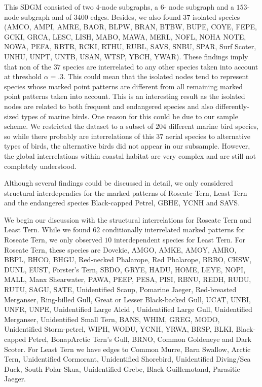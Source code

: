 \documentclass{statsoc}
\begin{document}
This SDGM consisted of two $4$-node subgraphs, a $6$- node subgraph and a $153$-node subgraph and of 3400 edges. Besides, we also found $37$ isolated species (AMCO, AMPI, AMRE, BAOR, BLPW, BRAN, BTBW, BUPE, COYE, FEPE, GCKI, GRCA, LESC, LISH, MABO, MAWA, MERL, NOFL, NOHA NOTE, NOWA, PEFA, RBTR, RCKI, RTHU, RUBL, SAVS, SNBU, SPAR, Surf Scoter, UNHU, UNPT, UNTB, USAN, WTSP, YBCH, YWAR). These findings imply that non of the $37$ species are interrelated to any other species taken into account at threshold $\alpha=.3$. This could mean that the isolated nodes tend to represent species whose marked point patterns are different from all remaining marked point patterns taken into account. This is an interesting result as the isolated nodes are related to both frequent and endangered species and also differently-sized types of marine birds. One reason for this could be due to our sample scheme. We restricted the dataset to a subset of $204$ different marine bird species, so while there probably are interrelations of this $37$ aerial species to alternative types of birds, the alternative birds did not appear in our subsample. However, the global interrelations within coastal habitat are very complex and are still not completely understood.


Although several findings could be discussed in detail, we only considered structural interdependies for the marked patterns of Roseate Tern, Least Tern and the endangered species Black-capped Petrel, GBHE, YCNH and SAVS.

We begin our discussion with the structural interrelations for Roseate Tern and Least Tern. While we found $62$ conditionally interrelated marked patterns for Roseate Tern, we only observed $10$ interdependent species for Least Tern. For Roseate Tern, these species are Dovekie, AMGO, AMKE, AMOY, AMRO, BBPL, BHCO, BHGU, Red-necked Phalarope, Red Phalarope, BRBO, CHSW, DUNL, EUST, Forster's Tern, SBDO, GRYE, HADU, HOME, LEYE, NOPI, MALL,  Manx Shearwater, PAWA, PEEP, PESA, PISI, RBNU, REDH, RUDU, RUTU, SAGU, SATE, Unidentified Scaup, Pomarine Jaeger, Red-breasted Merganser, Ring-billed Gull, Great or Lesser Black-backed Gull, UCAT, UNBI, UNFR, UNPE, Unidentified Large Alcid , Unidentified Large Gull, Unidentified Merganser, Unidentified Small Tern, BANS, WHIM, GREG, MODO, Unidentified Storm-petrel, WIPH, WODU, YCNH, YRWA, BRSP, BLKI, Black-capped Petrel,   BonapArctic Tern's Gull, BRNO, Common Goldeneye and Dark Scoter. 
For Least Tern we have edges to   Common Murre, Barn Swallow, Arctic Tern, Unidentified Cormorant, Unidentified Shorebird, Unidentified Diving/Sea Duck, South Polar Skua, Unidentified Grebe, Black Guillemotand, Parasitic Jaeger.
 
\end{document}
